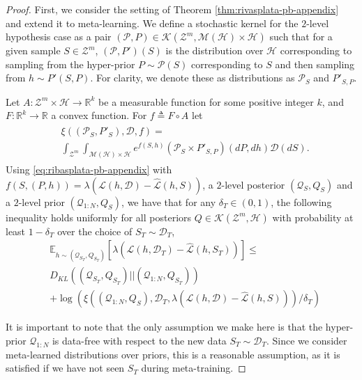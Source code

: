 \documentclass[letterpaper]{article} %
\theoremstyle{definition}
\newcommand{\Expect}[2]{\mathbb{E}_{#1}\left [#2 \right ]}
\begin{document}
\begin{proof}
	First, we consider the setting of Theorem \ref{thm:rivasplata-pb-appendix} and extend it to meta-learning. We define a stochastic kernel for the $2$-level hypothesis case as a pair $(\mathcal{P},P)\in \mathcal{K}(\mathcal{Z}^m, \mathcal{M}(\mathcal{H})\times \mathcal{H})$ such that for a given sample $S\in \mathcal{Z}^m$,  $(\mathcal{P},P')(S)$ is the distribution over $\mathcal{H}$ corresponding to sampling from the hyper-prior $P\sim \mathcal{P}(S)$ corresponding to $S$ and then sampling from $h\sim P'(S, P)$. For clarity, we denote these as distributions as $\mathcal{P}_S$ and $P'_{S,P}$. 
	
	Let $A: \mathcal{Z}^m\times \mathcal{H}\rightarrow \mathbb{R}^k$ be a measurable function for some positive integer $k$, and $F:\mathbb{R}^k\rightarrow \mathbb{R}$ a convex function.
	For $f\triangleq F\circ A$ let 
	\begin{align*} 
	\begin{split}
	&\xi((\mathcal{P}_S,P'_S), \mathcal{D}, f)=\\
	&\int_{\mathcal{Z}^m}\int_{\mathcal{M}(\mathcal{H})\times\mathcal{H}}e^{f(S, h)}\left(\mathcal{P}_S\times P'_{S,P}\right)(dP,dh)\mathcal{D}(dS) .
	\end{split}
	\end{align*}
%	
	Using \eqref{eq:ribasplata-pb-appendix} with $f(S,(P,h))=\lambda(\mathcal{L}(h,\mathcal{D})-\hat{\mathcal{L}}(h,S))$, a $2$-level posterior $(\mathcal{Q}_S, Q_S)$ and a $2$-level prior $(\mathcal{Q}_{1:N}, Q_S)$,
	we have that for any $\delta_T \in (0,1)$, the following inequality holds uniformly for all posteriors $Q\in \mathcal{K}(\mathcal{Z}^m, \mathcal{H})$ with probability at least $1-\delta_T$ over the choice of $S_T\sim \mathcal{D}_T$,
%	
	\begin{equation} \label{eq:appendix-proof-eq}
	\begin{split}
	&\Expect{h\sim (\mathcal{Q}_{S_T}, Q_{S_T})}{\lambda(\mathcal{L}(h,\mathcal{D}_T)-\hat{\mathcal{L}}(h,S_T))} \leq \\ &D_{KL}((\mathcal{Q}_{S_T}, Q_{S_T})||(\mathcal{Q}_{1:N}, Q_{S_T}))\\
	&+\log\left (\xi\left ((\mathcal{Q}_{1:N}, Q_S), \mathcal{D}_T, \lambda(\mathcal{L}(h,\mathcal{D})-\hat{\mathcal{L}}(h,S))\right )/\delta_T\right )
	\end{split}
	\end{equation}
	
	It is important to note that the only assumption we make here is that the hyper-prior $\mathcal{Q}_{1:N}$ is data-free with respect to the new data $S_T\sim \mathcal{D}_T$. Since we consider meta-learned distributions over priors, this is a reasonable assumption, as it is satisfied if we have not seen $S_T$ during meta-training.
	

\end{proof}
\end{document}
